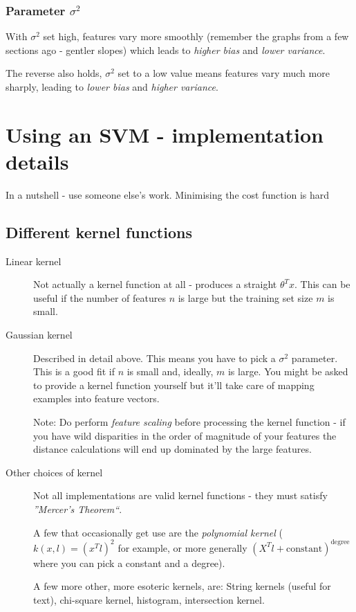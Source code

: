 \subsubsection{Parameter $\sigma^2$}

With $\sigma^2$ set high, features vary more smoothly (remember the graphs from a few sections ago - gentler slopes) which leads to \emph{higher bias} and \emph{lower variance}.

The reverse also holds, $\sigma^2$ set to a low value means features vary much more sharply, leading to \emph{lower bias} and \emph{higher variance}.

\section{Using an SVM - implementation details}

In a nutshell - use someone else's work. Minimising the cost function is hard

\subsection{Different kernel functions}

\begin{description}
\item[Linear kernel] Not actually a kernel function at all - produces a straight $\theta^Tx$. This can be useful if the number of features $n$ is large but the training set size $m$ is small.

\item[Gaussian kernel] Described in detail above. This means you have to pick a $\sigma^2$ parameter. This is a good fit if $n$ is small and, ideally, $m$ is large. You might be asked to provide a kernel function yourself but it'll take care of mapping examples into feature vectors.

Note: Do perform \emph{feature scaling} before processing the kernel function - if you have wild disparities in the order of magnitude of your features the distance calculations will end up dominated by the large features.

\item[Other choices of kernel] Not all implementations are valid kernel functions - they must satisfy \emph{''Mercer's Theorem``}.

A few that occasionally get use are the \emph{polynomial kernel} ($k(x,l) = (x^Tl)^2$ for example, or more generally $(X^Tl + \mathrm{constant})^{\mathrm{degree}}$ where you can pick a constant and a degree).

A few more other, more esoteric kernels, are: String kernels (useful for text), chi-square kernel, histogram, intersection kernel.
\end{description}

